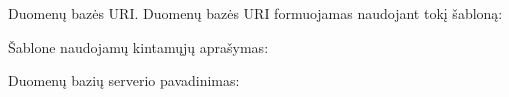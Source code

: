 \documentclass[letterpaper,10pt,lithuanian]{sphinxmanual}
\begin{document}
\begin{fulllineitems}

\pysigstartsignatures
{}
\pysigstopsignatures
\sphinxAtStartPar
Duomenų bazės URI. Duomenų bazės URI formuojamas naudojant tokį 
šabloną:

\begin{sphinxVerbatim}[commandchars=\\\{\}]
\PYG{p}{[}\PYG{p}{]}
\PYG{p}{[}\PYG{p}{[}\PYG{p}{]}\PYG{p}{]}
\PYG{p}{[}\PYG{p}{]}
\PYG{p}{[}\PYG{p}{]}
\end{sphinxVerbatim}

\sphinxAtStartPar
Šablone naudojamų kintamųjų aprašymas:


\begin{fulllineitems}

\pysigstartsignatures
{}
\pysigstopsignatures
\sphinxAtStartPar
Duomenų bazių serverio pavadinimas:


\begin{fulllineitems}

\pysigstartsignatures
{}
\pysigstopsignatures
\end{fulllineitems}



\begin{fulllineitems}

\pysigstartsignatures
{}
\pysigstopsignatures
\end{fulllineitems}



\begin{fulllineitems}

\pysigstartsignatures
{}
\pysigstopsignatures
\end{fulllineitems}




\end{fulllineitems}
\end{fulllineitems}
\end{document}
